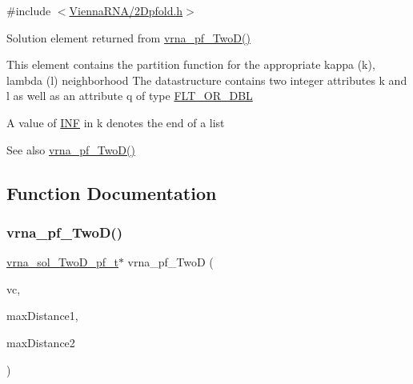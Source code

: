 {\ttfamily \#include $<$\mbox{\hyperlink{2_dpfold_8h}{Vienna\+R\+N\+A/2\+Dpfold.\+h}}$>$}



Solution element returned from \mbox{\hyperlink{group__kl__neighborhood__pf_ga0bc3427689bd09da09b8b3094a27f836}{vrna\+\_\+pf\+\_\+\+Two\+D()}} 

This element contains the partition function for the appropriate kappa (k), lambda (l) neighborhood The datastructure contains two integer attributes \textquotesingle{}k\textquotesingle{} and \textquotesingle{}l\textquotesingle{} as well as an attribute \textquotesingle{}q\textquotesingle{} of type \mbox{\hyperlink{group__data__structures_ga31125aeace516926bf7f251f759b6126}{F\+L\+T\+\_\+\+O\+R\+\_\+\+D\+BL}}

A value of \mbox{\hyperlink{energy__const_8h_a12c2040f25d8e3a7b9e1c2024c618cb6}{I\+NF}} in k denotes the end of a list

\begin{DoxySeeAlso}{See also}
\mbox{\hyperlink{group__kl__neighborhood__pf_ga0bc3427689bd09da09b8b3094a27f836}{vrna\+\_\+pf\+\_\+\+Two\+D()}} 
\end{DoxySeeAlso}


\subsection{Function Documentation}
\mbox{\label{group__kl__neighborhood__pf_ga0bc3427689bd09da09b8b3094a27f836}} 
\subsubsection{\texorpdfstring{vrna\+\_\+pf\+\_\+\+Two\+D()}{vrna\_pf\_TwoD()}}
{\footnotesize\ttfamily \mbox{\hyperlink{group__kl__neighborhood__pf_structvrna__sol___two_d__pf__t}{vrna\+\_\+sol\+\_\+\+Two\+D\+\_\+pf\+\_\+t}}$\ast$ vrna\+\_\+pf\+\_\+\+TwoD (\begin{DoxyParamCaption}\item[{\mbox{\hyperlink{group__fold__compound_ga1b0cef17fd40466cef5968eaeeff6166}{vrna\+\_\+fold\+\_\+compound\+\_\+t}} $\ast$}]{vc,  }\item[{int}]{max\+Distance1,  }\item[{int}]{max\+Distance2 }\end{DoxyParamCaption})}



